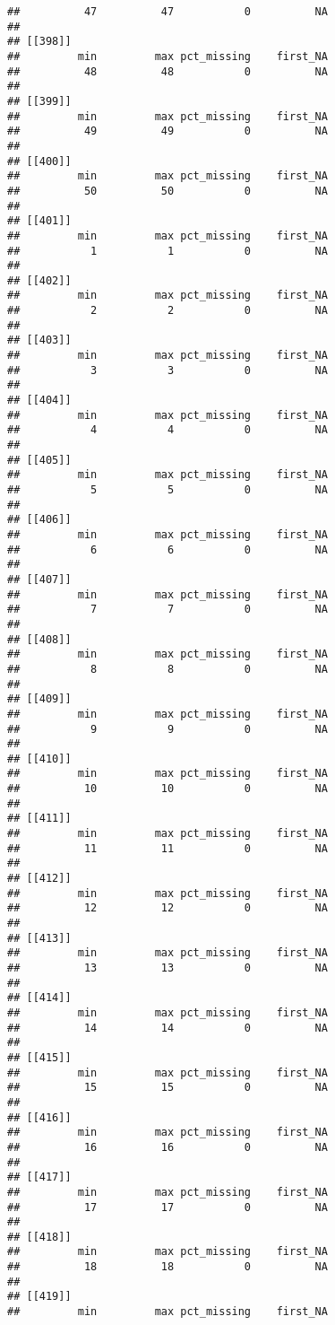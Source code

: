 \documentclass[
]{article}
\begin{document}
\begin{verbatim}
##          47          47           0          NA 
## 
## [[398]]
##         min         max pct_missing    first_NA 
##          48          48           0          NA 
## 
## [[399]]
##         min         max pct_missing    first_NA 
##          49          49           0          NA 
## 
## [[400]]
##         min         max pct_missing    first_NA 
##          50          50           0          NA 
## 
## [[401]]
##         min         max pct_missing    first_NA 
##           1           1           0          NA 
## 
## [[402]]
##         min         max pct_missing    first_NA 
##           2           2           0          NA 
## 
## [[403]]
##         min         max pct_missing    first_NA 
##           3           3           0          NA 
## 
## [[404]]
##         min         max pct_missing    first_NA 
##           4           4           0          NA 
## 
## [[405]]
##         min         max pct_missing    first_NA 
##           5           5           0          NA 
## 
## [[406]]
##         min         max pct_missing    first_NA 
##           6           6           0          NA 
## 
## [[407]]
##         min         max pct_missing    first_NA 
##           7           7           0          NA 
## 
## [[408]]
##         min         max pct_missing    first_NA 
##           8           8           0          NA 
## 
## [[409]]
##         min         max pct_missing    first_NA 
##           9           9           0          NA 
## 
## [[410]]
##         min         max pct_missing    first_NA 
##          10          10           0          NA 
## 
## [[411]]
##         min         max pct_missing    first_NA 
##          11          11           0          NA 
## 
## [[412]]
##         min         max pct_missing    first_NA 
##          12          12           0          NA 
## 
## [[413]]
##         min         max pct_missing    first_NA 
##          13          13           0          NA 
## 
## [[414]]
##         min         max pct_missing    first_NA 
##          14          14           0          NA 
## 
## [[415]]
##         min         max pct_missing    first_NA 
##          15          15           0          NA 
## 
## [[416]]
##         min         max pct_missing    first_NA 
##          16          16           0          NA 
## 
## [[417]]
##         min         max pct_missing    first_NA 
##          17          17           0          NA 
## 
## [[418]]
##         min         max pct_missing    first_NA 
##          18          18           0          NA 
## 
## [[419]]
##         min         max pct_missing    first_NA 

\end{verbatim}
\end{document}
